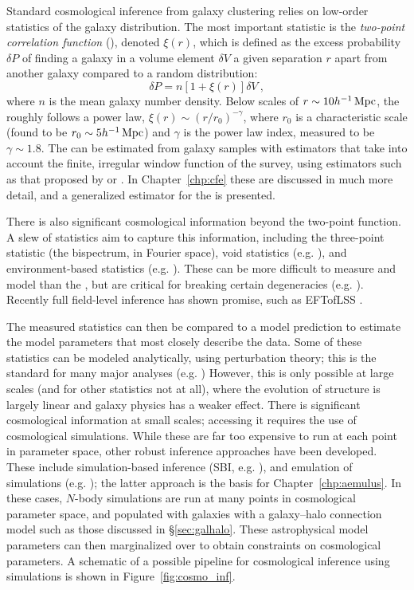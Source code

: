 Standard cosmological inference from galaxy clustering relies on low-order statistics of the galaxy distribution.
The most important statistic is the \emph{two-point correlation function} (\cf), denoted $\xi(r)$, which is defined as the excess probability $\delta P$ of finding a galaxy in a volume element $\delta V$ a given separation $r$ apart from another galaxy compared to a random distribution:
\begin{equation}
    \delta P = n[1+\xi(r)]\delta V ~,
\end{equation}
where $n$ is the mean galaxy number density.
Below scales of $r \sim 10 h^{-1}\,\mathrm{Mpc}$, the \cf roughly follows a power law, $\xi(r) \sim (r/r_0)^{-\gamma}$, where $r_0$ is a characteristic scale (found to be $r_0 \sim 5 h^{-1}\,\mathrm{Mpc}$) and $\gamma$ is the power law index, measured to be $\gamma \sim 1.8$.
The \cf can be estimated from galaxy samples with estimators that take into account the finite, irregular window function of the survey, using estimators such as that proposed by \cite{DavisPeebles1983} or \cite{LandySzalay1993}.
In Chapter~\ref{chp:cfe} these are discussed in much more detail, and a generalized estimator for the \cf is presented.

There is also significant cosmological information beyond the two-point function.
A slew of statistics aim to capture this information, including the three-point statistic (the bispectrum, in Fourier space), void statistics (e.g. \citealt{sheth_hierarchy_2004}), and environment-based statistics (e.g. \citealt{Sheth2004,tinker_void_2007}).
These can be more difficult to measure and model than the \cf, but are critical for breaking certain degeneracies (e.g. \cite{WhitePadmanabhan2009}).
Recently full field-level inference has shown promise, such as EFTofLSS \citep{baumann_cosmological_2012}.

The measured statistics can then be compared to a model prediction to estimate the model parameters that most closely describe the data.
Some of these statistics can be modeled analytically, using perturbation theory; this is the standard for many major analyses (e.g. \citealt{tegmark_cosmological_2006}) 
However, this is only possible at large scales (and for other statistics not at all), where the evolution of structure is largely linear and galaxy physics has a weaker effect.
There is significant cosmological information at small scales; accessing it requires the use of cosmological simulations.
While these are far too expensive to run at each point in parameter space, other robust inference approaches have been developed. 
These include simulation-based inference (SBI, e.g. \citealt{hahn_rm_2022}), and emulation of simulations (e.g. \citealt{Heitmann2009, Lawrence2017, Angulo2021}); the latter approach is the basis for Chapter~\ref{chp:aemulus}.
In these cases, $N$-body simulations are run at many points in cosmological parameter space, and populated with galaxies with a galaxy--halo connection model such as those discussed in \S\ref{sec:galhalo}.
These astrophysical model parameters can then marginalized over to obtain constraints on cosmological parameters.
A schematic of a possible pipeline for cosmological inference using simulations is shown in Figure~\ref{fig:cosmo_inf}.

